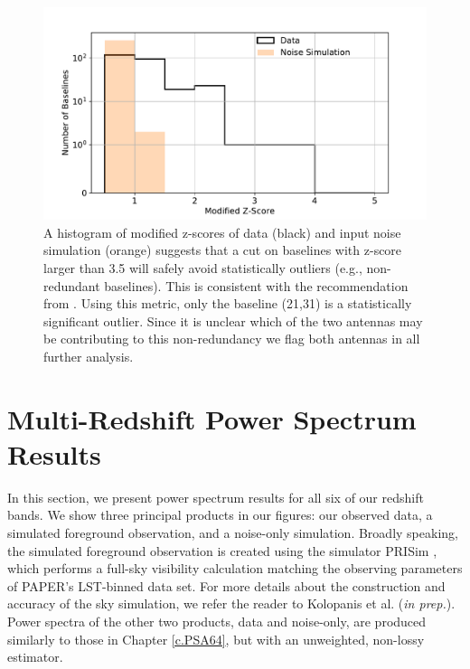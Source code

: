 \begin{figure}[tp]
	\centering
	\includegraphics[width=.85\textwidth]{plots/zscore_hist.pdf}
	\caption{A histogram of modified z-scores of data (black) 
		and input noise simulation (orange) suggests that a cut on baselines
		with z-score larger than 3.5 will safely avoid statistically outliers (e.g., non-redundant baselines). This is consistent with the
		recommendation from \cite{Iglewicz_and_hoaglin}. Using this metric,
		only the baseline (21,31) is a statistically significant outlier. Since it is unclear which of the two antennas may be contributing to this non-redundancy we flag both antennas in all further analysis.} %
\label{fig:mod_z_score_avg}
\end{figure}

\section{Multi-Redshift Power Spectrum Results}\label{sec:pspec_results}

In this section, we present power spectrum results for all six of our redshift bands. We show three principal products in our figures: our observed data, a simulated foreground observation, and a noise-only simulation. Broadly speaking, the simulated foreground observation is created using the simulator PRISim \citep{Thyagarajan_et_al2015b, Thyagarajan_et_al2015a}, which performs a full-sky visibility calculation matching the observing parameters of PAPER's LST-binned data set. For more details about the construction and accuracy of the sky simulation, we refer the reader to Kolopanis et al. (\textit{in prep.}). Power spectra of the other two products, data and noise-only, are produced similarly to those in Chapter \ref{c.PSA64}, but with an unweighted, non-lossy estimator.

